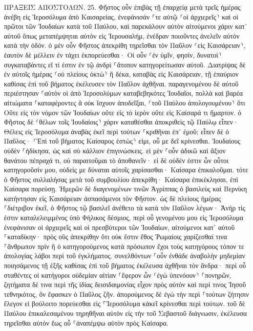 \documentclass[twoside, 9pt]{extreport}
\begin{document}
ΠΡΑΞΕΙΣ ΑΠΟΣΤΟΛΩΝ.
25.
Φῆστος οὖν ἐπιβὰς τῇ ἐπαρχείᾳ μετὰ τρεῖς ἡμέρας ἀνέβη εἰς Ἱεροσόλυμα ἀπὸ Καισαρείας, 
ἐνεφάνισάν ⸀τε αὐτῷ ⸂οἱ ἀρχιερεῖς⸃ καὶ οἱ πρῶτοι τῶν Ἰουδαίων κατὰ τοῦ Παύλου, καὶ παρεκάλουν αὐτὸν 
αἰτούμενοι χάριν κατ᾽ αὐτοῦ ὅπως μεταπέμψηται αὐτὸν εἰς Ἰερουσαλήμ, ἐνέδραν ποιοῦντες ἀνελεῖν αὐτὸν κατὰ τὴν ὁδόν. 
ὁ μὲν οὖν Φῆστος ἀπεκρίθη τηρεῖσθαι τὸν Παῦλον ⸂εἰς Καισάρειαν⸃, ἑαυτὸν δὲ μέλλειν ἐν τάχει ἐκπορεύεσθαι· 
Οἱ οὖν ⸂ἐν ὑμῖν, φησίν, δυνατοὶ⸃ συγκαταβάντες εἴ τί ἐστιν ἐν τῷ ἀνδρὶ ⸀ἄτοπον κατηγορείτωσαν αὐτοῦ. 
Διατρίψας δὲ ἐν αὐτοῖς ἡμέρας ⸂οὐ πλείους ὀκτὼ⸃ ἢ δέκα, καταβὰς εἰς Καισάρειαν, τῇ ἐπαύριον καθίσας ἐπὶ τοῦ βήματος ἐκέλευσεν τὸν Παῦλον ἀχθῆναι. 
παραγενομένου δὲ αὐτοῦ περιέστησαν ⸀αὐτὸν οἱ ἀπὸ Ἱεροσολύμων καταβεβηκότες Ἰουδαῖοι, πολλὰ καὶ βαρέα αἰτιώματα ⸀καταφέροντες ἃ οὐκ ἴσχυον ἀποδεῖξαι, 
⸂τοῦ Παύλου ἀπολογουμένου⸃ ὅτι Οὔτε εἰς τὸν νόμον τῶν Ἰουδαίων οὔτε εἰς τὸ ἱερὸν οὔτε εἰς Καίσαρά τι ἥμαρτον. 
ὁ Φῆστος δὲ ⸂θέλων τοῖς Ἰουδαίοις⸃ χάριν καταθέσθαι ἀποκριθεὶς τῷ Παύλῳ εἶπεν· Θέλεις εἰς Ἱεροσόλυμα ἀναβὰς ἐκεῖ περὶ τούτων ⸀κριθῆναι ἐπ᾽ ἐμοῦ; 
εἶπεν δὲ ὁ Παῦλος· ⸂Ἐπὶ τοῦ βήματος Καίσαρος ἑστώς⸃ εἰμι, οὗ με δεῖ κρίνεσθαι. Ἰουδαίους οὐδὲν ⸀ἠδίκησα, ὡς καὶ σὺ κάλλιον ἐπιγινώσκεις. 
εἰ μὲν ⸀οὖν ἀδικῶ καὶ ἄξιον θανάτου πέπραχά τι, οὐ παραιτοῦμαι τὸ ἀποθανεῖν· εἰ δὲ οὐδέν ἐστιν ὧν οὗτοι κατηγοροῦσίν μου, οὐδείς με δύναται αὐτοῖς χαρίσασθαι· Καίσαρα ἐπικαλοῦμαι. 
τότε ὁ Φῆστος συλλαλήσας μετὰ τοῦ συμβουλίου ἀπεκρίθη· Καίσαρα ἐπικέκλησαι, ἐπὶ Καίσαρα πορεύσῃ. 
Ἡμερῶν δὲ διαγενομένων τινῶν Ἀγρίππας ὁ βασιλεὺς καὶ Βερνίκη κατήντησαν εἰς Καισάρειαν ἀσπασάμενοι τὸν Φῆστον. 
ὡς δὲ πλείους ἡμέρας ⸀διέτριβον ἐκεῖ, ὁ Φῆστος τῷ βασιλεῖ ἀνέθετο τὰ κατὰ τὸν Παῦλον λέγων· Ἀνήρ τίς ἐστιν καταλελειμμένος ὑπὸ Φήλικος δέσμιος, 
περὶ οὗ γενομένου μου εἰς Ἱεροσόλυμα ἐνεφάνισαν οἱ ἀρχιερεῖς καὶ οἱ πρεσβύτεροι τῶν Ἰουδαίων, αἰτούμενοι κατ᾽ αὐτοῦ ⸀καταδίκην· 
πρὸς οὓς ἀπεκρίθην ὅτι οὐκ ἔστιν ἔθος Ῥωμαίοις χαρίζεσθαί τινα ⸀ἄνθρωπον πρὶν ἢ ὁ κατηγορούμενος κατὰ πρόσωπον ἔχοι τοὺς κατηγόρους τόπον τε ἀπολογίας λάβοι περὶ τοῦ ἐγκλήματος. 
συνελθόντων ⸀οὖν ἐνθάδε ἀναβολὴν μηδεμίαν ποιησάμενος τῇ ἑξῆς καθίσας ἐπὶ τοῦ βήματος ἐκέλευσα ἀχθῆναι τὸν ἄνδρα· 
περὶ οὗ σταθέντες οἱ κατήγοροι οὐδεμίαν αἰτίαν ⸀ἔφερον ὧν ⸂ἐγὼ ὑπενόουν⸃ ⸀πονηρῶν, 
ζητήματα δέ τινα περὶ τῆς ἰδίας δεισιδαιμονίας εἶχον πρὸς αὐτὸν καὶ περί τινος Ἰησοῦ τεθνηκότος, ὃν ἔφασκεν ὁ Παῦλος ζῆν. 
ἀπορούμενος δὲ ἐγὼ τὴν περὶ ⸀τούτων ζήτησιν ἔλεγον εἰ βούλοιτο πορεύεσθαι εἰς ⸀Ἱεροσόλυμα κἀκεῖ κρίνεσθαι περὶ τούτων. 
τοῦ δὲ Παύλου ἐπικαλεσαμένου τηρηθῆναι αὐτὸν εἰς τὴν τοῦ Σεβαστοῦ διάγνωσιν, ἐκέλευσα τηρεῖσθαι αὐτὸν ἕως οὗ ⸀ἀναπέμψω αὐτὸν πρὸς Καίσαρα. 
\end{document}
